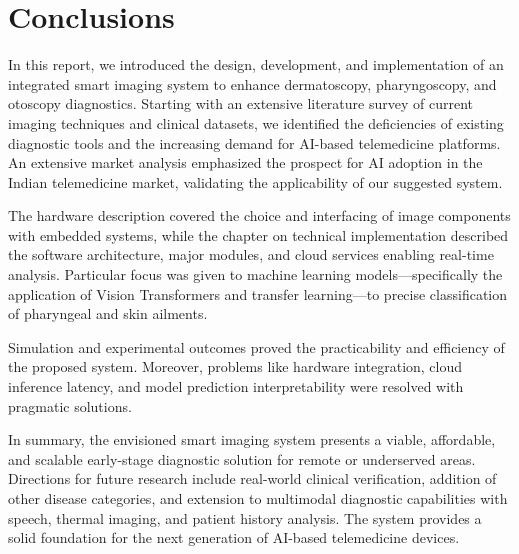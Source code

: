 \chapter{Conclusions}
In this report, we introduced the design, development, and implementation of an integrated smart imaging system to enhance dermatoscopy, pharyngoscopy, and otoscopy diagnostics. Starting with an extensive literature survey of current imaging techniques and clinical datasets, we identified the deficiencies of existing diagnostic tools and the increasing demand for AI-based telemedicine platforms. An extensive market analysis emphasized the prospect for AI adoption in the Indian telemedicine market, validating the applicability of our suggested system. \par

The hardware description covered the choice and interfacing of image components with embedded systems, while the chapter on technical implementation described the software architecture, major modules, and cloud services enabling real-time analysis. Particular focus was given to machine learning models—specifically the application of Vision Transformers and transfer learning—to precise classification of pharyngeal and skin ailments.\par

Simulation and experimental outcomes proved the practicability and efficiency of the proposed system. Moreover, problems like hardware integration, cloud inference latency, and model prediction interpretability were resolved with pragmatic solutions. \par

In summary, the envisioned smart imaging system presents a viable, affordable, and scalable early-stage diagnostic solution for remote or underserved areas. Directions for future research include real-world clinical verification, addition of other disease categories, and extension to multimodal diagnostic capabilities with speech, thermal imaging, and patient history analysis. The system provides a solid foundation for the next generation of AI-based telemedicine devices.
